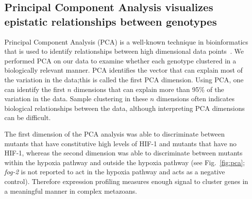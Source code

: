 \documentclass[9pt,twocolumn,twoside,lineno]{pnas-new}
\newcommand{\gene}[1]{\emph{#1}}
\newcommand{\fog}{\emph{\mbox{fog-2(lf)}}}
\newcommand{\egl}{\emph{\mbox{egl-9}(lf)}}
\newcommand{\rhy}{\emph{\mbox{rhy-1}(lf)}}
\newcommand{\vhl}{\emph{\mbox{vhl-1}(lf)}}
\newcommand{\eglvhl}{\emph{\mbox{egl-9(lf);vhl-1(lf)}}}
\newcommand{\eglhif}{\emph{\mbox{egl-9(lf)}~\mbox{hif-1(lf)}}}
\newcommand{\hif}{\emph{\mbox{hif-1(lf)}}}
\newcommand{\hifp}{HIF-1}
\begin{document}
\subsection*{Principal Component Analysis visualizes epistatic relationships
             between genotypes}
\label{sub:Clustering}

Principal Component Analysis (PCA) is a well-known technique in bioinformatics
that is used to identify relationships between high dimensional data
points~\cite{Yeung2001}. We performed PCA on our data to examine whether each
genotype clustered in a biologically relevant manner. PCA identifies the vector
that can explain most of the variation in the data;this is called the first PCA
dimension. Using PCA, one can identify the first $n$ dimensions that can explain
more than 95\% of the variation in the data. Sample clustering in these $n$
dimensions often indicates biological relationships between the data, although
interpreting PCA dimensions can be difficult.


The first dimension of the PCA analysis was able to discriminate between mutants
that have constitutive high levels of \hifp{} and mutants that have no \hifp{},
whereas the second dimension was able to discriminate between mutants within the
hypoxia pathway and outside the hypoxia pathway (see Fig.~\ref{fig:pca};
\gene{fog-2} is not reported to act in the hypoxia pathway and acts as a negative
control). Therefore expression profiling measures enough signal to cluster genes
in a meaningful manner in complex metazoans.
\end{document}
